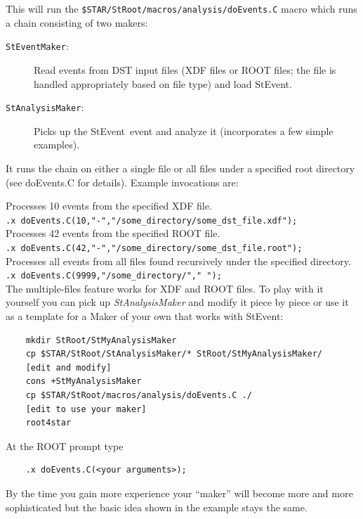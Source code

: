 \documentclass[twoside]{article}
\newcommand{\name}[1]{\textsl{#1}}%
\newcommand{\StEvent}{\textsf{StEvent}}
\begin{document}
This will run the \texttt{\$STAR/StRoot/macros/analysis/doEvents.C}
macro which runs a chain consisting of two makers:
\begin{description}
\item[\texttt{StEventMaker}:] Read events from DST input files (XDF
    files or ROOT files; the file is handled appropriately based on
    file type) and load \StEvent.
\item[\texttt{StAnalysisMaker}:] Picks up the \StEvent\ event and
    analyze it (incorporates a few simple examples).
\end{description}
It runs the chain on either a single file or all files under a
specified root directory (see doEvents.C for details). Example
invocations are:

Processes 10 events from the specified XDF file.\\
\hspace{1cm}\verb+.x doEvents.C(10,"-","/some_directory/some_dst_file.xdf");+\\

Processes 42 events from the specified ROOT file.\\
\hspace{1cm}\verb+.x doEvents.C(42,"-","/some_directory/some_dst_file.root");+\\

Processes all events from all files found recursively under the
specified directory.\\
\verb+.x doEvents.C(9999,"/some_directory/"," ");+\\

The multiple-files feature works for XDF and ROOT files.  To play with
it yourself you can pick up \name{StAnalysisMaker} and modify it piece
by piece or use it as a template for a Maker of your own that works
with \StEvent:

\begin{verbatim}
    mkdir StRoot/StMyAnalysisMaker
    cp $STAR/StRoot/StAnalysisMaker/* StRoot/StMyAnalysisMaker/
    [edit and modify]
    cons +StMyAnalysisMaker
    cp $STAR/StRoot/macros/analysis/doEvents.C ./
    [edit to use your maker]
    root4star
\end{verbatim}
At the ROOT prompt type
\begin{verbatim}
    .x doEvents.C(<your arguments>);
\end{verbatim}
By the time you gain more experience your ``maker'' will become more
and more sophisticated but the basic idea shown in the example stays
the same.
\end{document}
